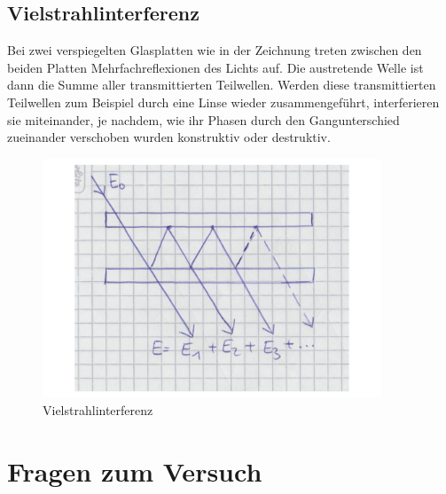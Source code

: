 \documentclass[a4paper,10pt]{scrartcl}
\begin{document}
	\subsection{Vielstrahlinterferenz}
	Bei zwei verspiegelten Glasplatten wie in der Zeichnung treten zwischen den beiden Platten Mehrfachreflexionen des Lichts auf. Die austretende Welle ist dann die Summe aller transmittierten Teilwellen. Werden diese transmittierten Teilwellen zum Beispiel durch eine Linse wieder zusammengeführt, interferieren sie miteinander, je nachdem, wie ihr Phasen durch den Gangunterschied zueinander verschoben wurden konstruktiv oder destruktiv.
	\begin{figure}[h]
\centering
\includegraphics[width=0.9\textwidth]{./Bilder/fp3}
\caption{Vielstrahlinterferenz}
\end{figure}
\FloatBarrier
	
	\section{Fragen zum Versuch}
\end{document}
